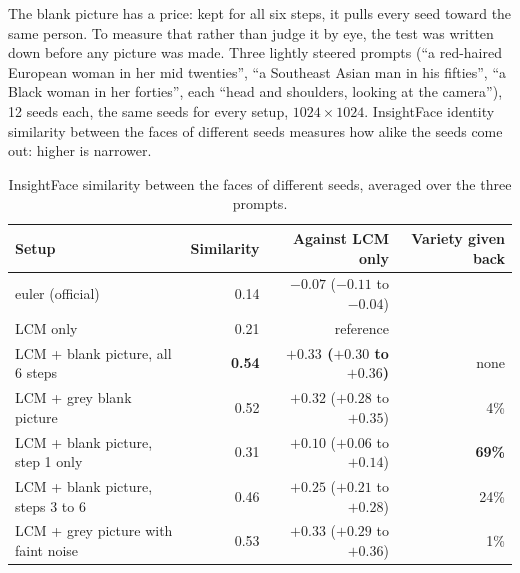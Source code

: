 \documentclass[11pt,a4paper]{article}
\begin{document}
The blank picture has a price: kept for all six steps, it pulls every seed toward the same person. To measure that rather than judge it by eye, the test was written down before any picture was made. Three lightly steered prompts (``a red-haired European woman in her mid twenties'', ``a Southeast Asian man in his fifties'', ``a Black woman in her forties'', each ``head and shoulders, looking at the camera''), 12 seeds each, the same seeds for every setup, $1024\times1024$. InsightFace identity similarity between the faces of different seeds measures how alike the seeds come out: higher is narrower.

\begin{table}[H]
\centering
\small
\begin{tabularx}{\linewidth}{X r r r}
\toprule
Setup & Similarity & Against LCM only & Variety given back \\
\midrule
euler (official) & 0.14 & $-0.07$ ($-0.11$ to $-0.04$) & \\
LCM only & 0.21 & reference & \\
LCM + blank picture, all 6 steps & \textbf{0.54} & \textbf{$+0.33$ ($+0.30$ to $+0.36$)} & none \\
LCM + grey blank picture & 0.52 & $+0.32$ ($+0.28$ to $+0.35$) & 4\% \\
LCM + blank picture, step 1 only & 0.31 & $+0.10$ ($+0.06$ to $+0.14$) & \textbf{69\%} \\
LCM + blank picture, steps 3 to 6 & 0.46 & $+0.25$ ($+0.21$ to $+0.28$) & 24\% \\
LCM + grey picture with faint noise & 0.53 & $+0.33$ ($+0.29$ to $+0.36$) & 1\% \\
\bottomrule
\end{tabularx}
\caption{InsightFace similarity between the faces of different seeds, averaged over the three prompts.}
\label{tab:narrowing}
\end{table}

\medskip
\end{document}
